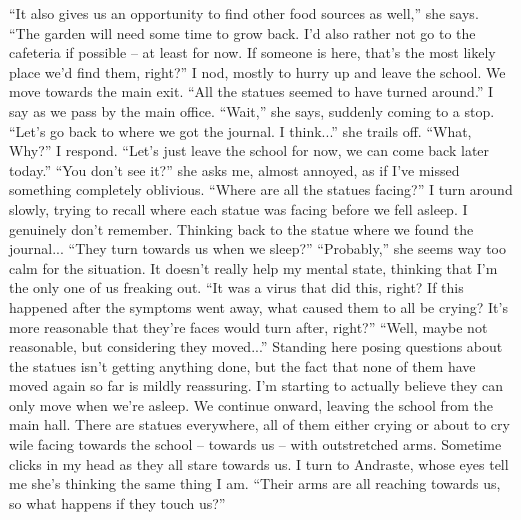\documentclass[a4paper, 12pt]{book}
\newcommand\tab[1][1cm]{\hspace*{#1}}
\begin{document}
\newline
\tab
``It also gives us an opportunity to find other food sources as well,'' she says. ``The garden will need some time to grow back. I’d also rather not go to the cafeteria if possible -- at least for now. If someone is here, that’s the most likely place we’d find them, right?'' I nod, mostly to hurry up and leave the school.
\newline
\tab
We move towards the main exit. ``All the statues seemed to have turned around.'' I say as we pass by the main office.
\newline
\tab
``Wait,'' she says, suddenly coming to a stop. ``Let’s go back to where we got the journal. I think...'' she trails off.
\newline
\tab
``What, Why?'' I respond. ``Let’s just leave the school for now, we can come back later today.''
\newline
\tab
``You don’t see it?'' she asks me, almost annoyed, as if I’ve missed something completely oblivious. ``Where are all the statues facing?''
\newline
\tab
I turn around slowly, trying to recall where each statue was facing before we fell asleep. I genuinely don’t remember. Thinking back to the statue where we found the journal... ``They turn towards us when we sleep?''
\newline
\tab
``Probably,'' she seems way too calm for the situation. It doesn’t really help my mental state, thinking that I’m the only one of us freaking out.
\newline
\tab
``It was a virus that did this, right? If this happened after the symptoms went away, what caused them to all be crying? It’s more reasonable that they’re faces would turn after, right?''
\newline
\tab
``Well, maybe not reasonable, but considering they moved...'' Standing here posing questions about the statues isn’t getting anything done, but the fact that none of them have moved again so far is mildly reassuring. I’m starting to actually believe they can only move when we’re asleep.
\newline
\tab
We continue onward, leaving the school from the main hall. There are statues everywhere, all of them either crying or about to cry wile facing towards the school -- towards us -- with outstretched arms. Sometime clicks in my head as they all stare towards us. I turn to Andraste, whose eyes tell me she’s thinking the same thing I am. ``Their arms are all reaching towards us, so what happens if they touch us?''
\newline
\end{document}
